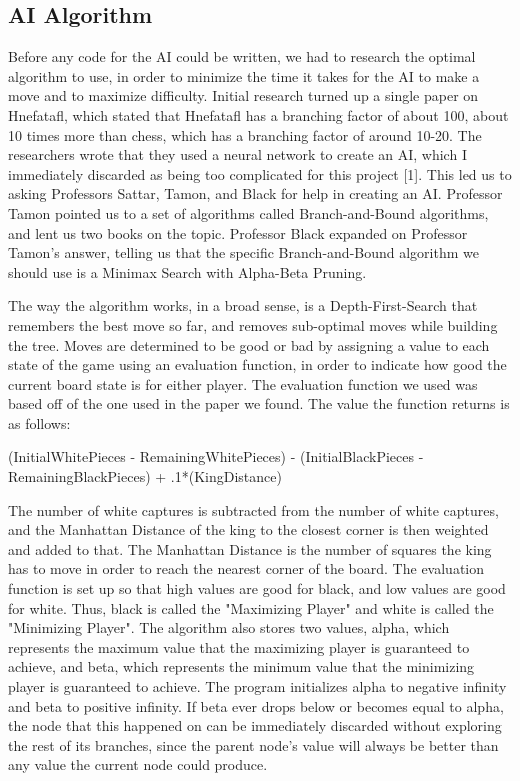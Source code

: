 \documentclass{article}
\begin{document}
\subsection{AI Algorithm}
	Before any code for the AI could be written, we had to research the optimal algorithm to use, in order to minimize the time it takes for the AI to make a move and to maximize difficulty. Initial research turned up a single paper on Hnefatafl, which stated that Hnefatafl has a branching factor of about 100, about 10 times more than chess, which has a branching factor of around 10-20. The researchers wrote that they used a neural network to create an AI, which I immediately discarded as being too complicated for this project [1]. This led us to asking Professors Sattar, Tamon, and Black for help in creating an AI. Professor Tamon pointed us to a set of algorithms called Branch-and-Bound algorithms, and lent us two books on the topic. Professor Black expanded on Professor Tamon's answer, telling us that the specific Branch-and-Bound algorithm we should use is a Minimax Search with Alpha-Beta Pruning. \par
	The way the algorithm works, in a broad sense, is a Depth-First-Search that remembers the best move so far, and removes sub-optimal moves while building the tree. Moves are determined to be good or bad by assigning a value to each state of the game using an evaluation function, in order to indicate how good the current board state is for either player. The evaluation function we used was based off of the one used in the paper we found. The value the function returns is as follows:
\begin{center}
	(InitialWhitePieces - RemainingWhitePieces) - (InitialBlackPieces - RemainingBlackPieces) + .1*(KingDistance)
\end{center}
The number of white captures is subtracted from the number of white captures, and the Manhattan Distance of the king to the closest corner is then weighted and added to that. The Manhattan Distance is the number of squares the king has to move in order to reach the nearest corner of the board. The evaluation function is set up so that high values are good for black, and low values are good for white. Thus, black is called the "Maximizing Player" and white is called the "Minimizing Player". The algorithm also stores two values, alpha, which represents the maximum value that the maximizing player is guaranteed to achieve, and beta, which represents the minimum value that the minimizing player is guaranteed to achieve. The program initializes alpha to negative infinity and beta to positive infinity. If beta ever drops below or becomes equal to alpha, the node that this happened on can be immediately discarded without exploring the rest of its branches, since the parent node's value will always be better than any value the current node could produce. \par
\end{document}

